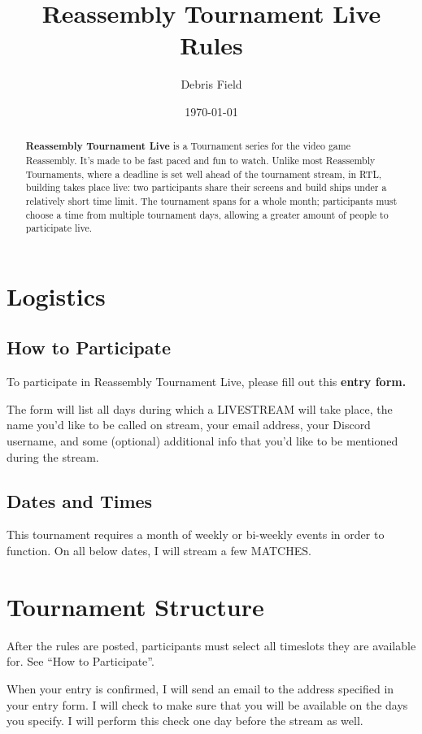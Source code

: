 \documentclass[11pt]{article}
\newcommand{\RTL}{Reassembly Tournament Live}
\newcommand{\termemph}[1]{\uppercase{#1}}
\begin{document}
\title{Reassembly Tournament Live Rules}
\author{Debris Field}
\date{\today}
\maketitle

\begin{abstract}
\textbf{\RTL{}} is a Tournament
series for the video game Reassembly. It's made to be fast paced and fun to watch. Unlike most Reassembly Tournaments, where
a deadline is set well ahead of the tournament stream, in RTL,
building takes place live: two participants share their screens and
build ships under a relatively short time limit. The tournament spans
for a whole month; participants must choose a time from multiple
tournament days, allowing a greater amount of people to participate live.

\end{abstract}

\tableofcontents

\section{Logistics}
\subsection{How to Participate}
To participate in \RTL{}, please fill out this \textbf{entry form.}

The form will list all days during which a \termemph{Livestream} will take place, the name you'd like to
be called on stream, your email address, your Discord username, and 
some (optional) additional info that you'd like to be mentioned during the stream.

\subsection{Dates and Times}
This tournament requires a month of weekly or bi-weekly events in order to function. On all
below dates, I will stream a few \termemph{matches}.  

\section{Tournament Structure}
After the rules are posted, participants must select all timeslots they are available for.
See ``How to Participate''.

When your entry is confirmed, I will send an email to the address specified in your entry form.
I will check to make sure that you will be available on the days you specify.
I will perform this check one day before the stream as well.\\
\end{document}
